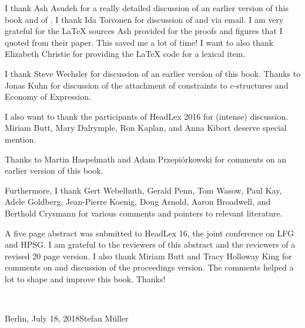 I thank Ash Asudeh for a really detailed discussion of an earlier version of this book and of
. I thank Ida Toivonen for discussion of  and 
via email. I am very grateful for the \LaTeX{} sources Ash provided for the proofs and figures
that I quoted from their paper. This saved me a lot of time! I want to also thank Elizabeth Christie
for providing the \LaTeX{} code for a lexical item.

I thank Steve Wechsler for discussion of an earlier version of this book. Thanks to Jonas Kuhn for
discussion of the attachment of constraints to c-structures and Economy of Expression.

I also want to thank the participants of HeadLex 2016 for (intense) discussion. Miriam Butt, Mary Dalrymple,
 Ron Kaplan, and Anna Kibort deserve special mention.

Thanks to Martin Haspelmath and Adam Przepiórkowski for comments on an earlier version of this book.

Furthermore, I thank Gert Webelhuth, Gerald Penn, Tom Wasow, Paul Kay, %
Adele Goldberg, Jean-Pierre Koenig, Doug Arnold, Aaron Broadwell, and Berthold Crysmann for various
comments and pointers to relevant literature.

A five page abstract was submitted to HeadLex 16, the joint conference on LFG and HPSG. I am
grateful to the reviewers of this abstract and the reviewers of a revised 20 page version. I also
thank Miriam Butt and Tracy Holloway King for comments on and discussion of the proceedings version.  The
comments helped a lot to shape and improve this book. Thanks!  

~\medskip

\noindent
Berlin, July 18, 2018\hfill Stefan Müller


\mainmatter


